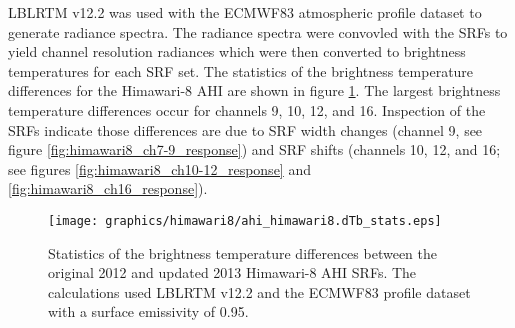 LBLRTM \citep{Clough_2005} v12.2 was used with the ECMWF83 atmospheric profile dataset to generate radiance spectra. The radiance spectra were convovled with the SRFs to yield channel resolution radiances which were then converted to brightness temperatures for each SRF set. The statistics of the brightness temperature differences for the Himawari-8 AHI are shown in figure \ref{fig:ahi_himawari8_dTb_stats}. The largest brightness temperature differences occur for channels 9, 10, 12, and 16. Inspection of the SRFs indicate those differences are due to SRF width changes (channel 9, see figure \ref{fig:himawari8_ch7-9_response}) and SRF shifts (channels 10, 12, and 16; see figures \ref{fig:himawari8_ch10-12_response} and \ref{fig:himawari8_ch16_response}).

\begin{figure}[H]
  \caption{Statistics of the brightness temperature differences between the original 2012 and updated 2013 Himawari-8 AHI SRFs. The calculations used LBLRTM v12.2 and the ECMWF83 profile dataset with a surface emissivity of 0.95.}
  \label{fig:ahi_himawari8_dTb_stats}
  \centering
  \texttt{[image: graphics/himawari8/ahi\_himawari8.dTb\_stats.eps]}
\end{figure}



\clearpage



\begin{appendix}
  
  
\end{appendix}



